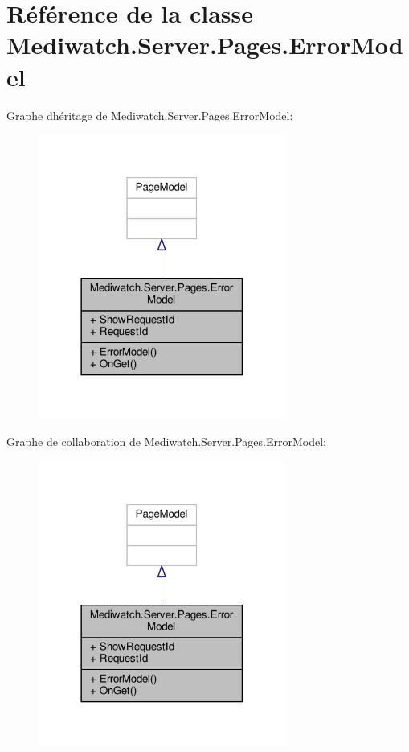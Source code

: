 \hypertarget{class_mediwatch_1_1_server_1_1_pages_1_1_error_model}{}\section{Référence de la classe Mediwatch.\+Server.\+Pages.\+Error\+Model}
\label{class_mediwatch_1_1_server_1_1_pages_1_1_error_model}


Graphe d\textquotesingle{}héritage de Mediwatch.\+Server.\+Pages.\+Error\+Model\+:\nopagebreak
\begin{figure}[H]
\begin{center}
\leavevmode
\includegraphics[width=230pt]{class_mediwatch_1_1_server_1_1_pages_1_1_error_model__inherit__graph}
\end{center}
\end{figure}


Graphe de collaboration de Mediwatch.\+Server.\+Pages.\+Error\+Model\+:\nopagebreak
\begin{figure}[H]
\begin{center}
\leavevmode
\includegraphics[width=230pt]{class_mediwatch_1_1_server_1_1_pages_1_1_error_model__coll__graph}
\end{center}
\end{figure}
